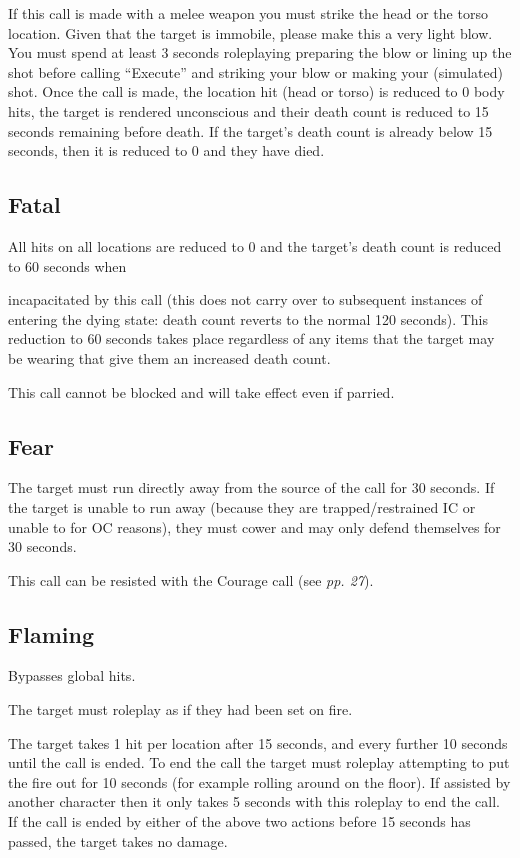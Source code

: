\documentclass{scrbook}
\begin{document}
If this call is made with a melee weapon you must strike the head or the torso location. Given that the target is immobile, please make this a very light blow. You must spend at least 3 seconds roleplaying preparing the blow or lining up the shot before calling ``Execute'' and striking your blow or making your (simulated) shot. Once the call is made, the location hit (head or torso) is reduced to 0 body hits, the target is rendered unconscious and their death count is reduced to 15 seconds remaining before death. If the target's death count is already below 15 seconds, then it is reduced to 0 and they have died.

\subsection{Fatal}

All hits on all locations are reduced to 0 and the target's death count is reduced to 60 seconds when

incapacitated by this call (this does not carry over to subsequent instances of entering the dying state: death count reverts to the normal 120 seconds). This reduction to 60 seconds takes place regardless of any items that the target may be wearing that give them an increased death count.

This call cannot be blocked and will take effect even if parried.

\subsection{Fear}

The target must run directly away from the source of the call for 30 seconds. If the target is unable to run away (because they are trapped/restrained IC or unable to for OC reasons), they must cower and may only defend themselves for 30 seconds.

This call can be resisted with the Courage call (see \textit{pp. 27}).

\subsection{Flaming}

Bypasses global hits.

The target must roleplay as if they had been set on fire.

The target takes 1 hit per location after 15 seconds, and every further 10 seconds until the call is ended. To end the call the target must roleplay attempting to put the fire out for 10 seconds (for example rolling around on the floor). If assisted by another character then it only takes 5 seconds with this roleplay to end the call. If the call is ended by either of the above two actions before 15 seconds has passed, the target takes no damage.
\end{document}
